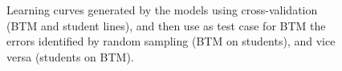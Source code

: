 \begin{figure}[t]
\caption{Learning curves generated by the models
using cross-validation (BTM and student lines), and then use as test case for BTM the errors identified by random sampling (BTM on students), and vice versa (students on BTM).}
\label{fig:curves}
\end{figure}


